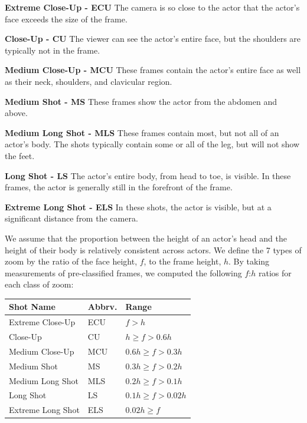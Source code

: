 
\textbf{Extreme Close-Up - ECU} The camera is so close to the actor that the actor's face exceeds the size of the frame.

\textbf{Close-Up - CU} The viewer can see the actor's entire face, but the shoulders are typically not in the frame. 

\textbf{Medium Close-Up - MCU} These frames contain the actor's entire face as well as their neck, shoulders, and clavicular region. 

\textbf{Medium Shot - MS} These frames show the actor from the abdomen and above. 

\textbf{Medium Long Shot - MLS} These frames contain most, but not all of an actor's body. The shots typically contain some or all of the leg, but will not show the feet. %

\textbf{Long Shot - LS} The actor's entire body, from head to toe, is visible. In these frames, the actor is generally still in the forefront of the frame. 

\textbf{Extreme Long Shot - ELS} In these shots, the actor is visible, but at a significant distance from the camera. 


We assume that the proportion between the height of an actor's head and the height of their body is relatively consistent across actors. We define the 7 types of zoom by the ratio of the face height, $f$, to the frame height, $h$. By taking measurements of pre-classified frames, we computed the following $f$:$h$ ratios for each class of zoom:

\begin{center}
  \begin{tabular}{ l | l l}
    Shot Name & Abbrv. & Range \\ \hline
    Extreme Close-Up & ECU & $f > h$ \\ 
    Close-Up & CU & $h \geq f > 0.6h$ \\ 
    Medium Close-Up & MCU & $0.6h \geq f > 0.3h$ \\ 
    Medium Shot & MS & $0.3h \geq f > 0.2h$ \\ 
    Medium Long Shot & MLS & $0.2h \geq f > 0.1h$ \\ 
    Long Shot & LS & $0.1h \geq f > 0.02h$ \\ 
    Extreme Long Shot & ELS & $0.02h \geq f$
    \label{tab:zoomTypes}
  \end{tabular}
\end{center}

